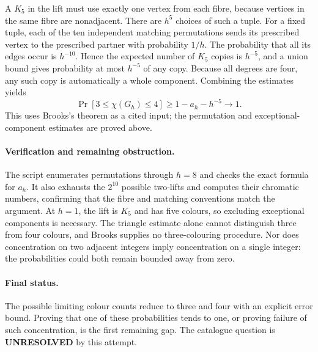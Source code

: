 \documentclass[11pt,a4paper]{article}
\begin{document}
A $K_5$ in the lift must use exactly one vertex from each fibre, because vertices in the same fibre are nonadjacent. There are $h^5$ choices of such a tuple. For a fixed tuple, each of the ten independent matching permutations sends its prescribed vertex to the prescribed partner with probability $1/h$. The probability that all its edges occur is $h^{-10}$. Hence the expected number of $K_5$ copies is $h^{-5}$, and a union bound gives probability at most $h^{-5}$ of any copy. Because all degrees are four, any such copy is automatically a whole component. Combining the estimates yields
\[
 \Pr[3\le\chi(G_h)\le4]\ge1-a_h-h^{-5}\longrightarrow1.
\]
This uses Brooks's theorem as a cited input; the permutation and exceptional-component estimates are proved above.

\paragraph{Verification and remaining obstruction.}
The script enumerates permutations through $h=8$ and checks the exact formula for $a_h$. It also exhausts the $2^{10}$ possible two-lifts and computes their chromatic numbers, confirming that the fibre and matching conventions match the argument. At $h=1$, the lift is $K_5$ and has five colours, so excluding exceptional components is necessary. The triangle estimate alone cannot distinguish three from four colours, and Brooks supplies no three-colouring procedure. Nor does concentration on two adjacent integers imply concentration on a single integer: the probabilities could both remain bounded away from zero.

\paragraph{Final status.}
The possible limiting colour counts reduce to three and four with an explicit error bound. Proving that one of these probabilities tends to one, or proving failure of such concentration, is the first remaining gap. The catalogue question is \textbf{UNRESOLVED} by this attempt.
\end{document}
